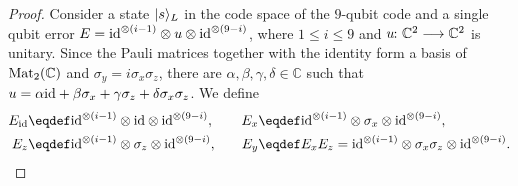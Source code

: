 \documentclass[a4paper, oneside, 12pt]{amsart}
\begin{document}
\begin{proof}
  Consider a state \(\lvert s\rangle_{L}\) in the code space of the \(9\)-qubit code and a single qubit error \(E= \mathrm{id}^{\otimes (i-1)}\otimes u \otimes \mathrm{id}^{\otimes (9-i)}\), where \(1\leq i \leq 9\) and \(u \from \mathbb{C}^{2} \to  \mathbb{C}^{2}\) is unitary.
  Since the Pauli matrices together with the identity form a basis of \(\operatorname{Mat}_{2}(\mathbb{C})\) and \( \sigma_{y} = i\sigma_{x}\sigma_{z}\), there are \(\alpha, \beta, \gamma, \delta \in \mathbb{C}\) such that \(u= \alpha \mathrm{id} + \beta \sigma_{x}+ \gamma \sigma_{z} + \delta\sigma_{x}\sigma_{z}\).
  We define
  \begin{align*}
    E_{\id} &\eqdef \id^{\otimes (i-1)}\otimes \id \otimes \id^{\otimes (9-i)}, \quad
    & E_{x} &\eqdef \id^{\otimes (i-1)}\otimes \sigma_{x} \otimes \id^{\otimes (9-i)}, \\
    E_{z} &\eqdef  \id^{\otimes (i-1)}\otimes \sigma_{z} \otimes \id^{\otimes (9-i)}, \quad
    & E_{y} &\eqdef E_{x}E_{z} =  \id^{\otimes (i-1)}\otimes \sigma_{x}\sigma_{z} \otimes \id^{\otimes (9-i)}.
  \end{align*}


\end{proof}
\end{document}
